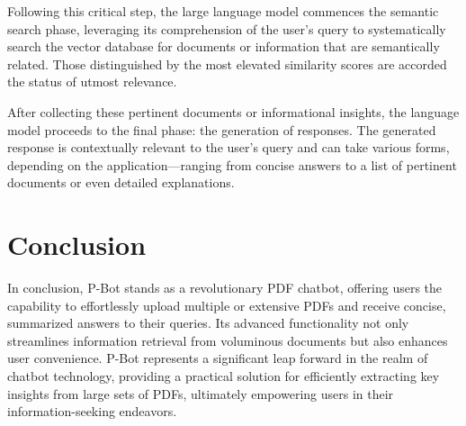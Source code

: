 \documentclass[fleqn,10pt]{thescipub} %
\begin{document}
Following this critical step, the large language model commences the semantic search phase, leveraging its comprehension of the user's query to systematically search the vector database for documents or information that are semantically related. Those distinguished by the most elevated similarity scores are accorded the status of utmost relevance.

After collecting these pertinent documents or informational insights, the language model proceeds to the final phase: the generation of responses. The generated response is contextually relevant to the user's query and can take various forms, depending on the application—ranging from concise answers to a list of pertinent documents or even detailed explanations.



\section{Conclusion}
In conclusion, P-Bot stands as a revolutionary PDF chatbot, offering users the capability to effortlessly upload multiple or extensive PDFs and receive concise, summarized answers to their queries. Its advanced functionality not only streamlines information retrieval from voluminous documents but also enhances user convenience. P-Bot represents a significant leap forward in the realm of chatbot technology, providing a practical solution for efficiently extracting key insights from large sets of PDFs, ultimately empowering users in their information-seeking endeavors.


\end{document}
